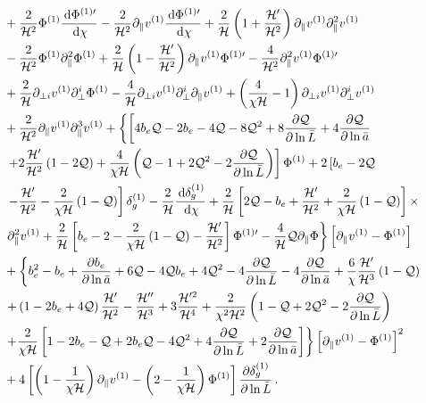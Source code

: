 \begin{align}
& + \frac{2}{\mathcal{H}^2} \Phi^{(1)} \frac{\,\mathrm{d} \Phi^{{(1)}\prime} }{\,\mathrm{d} \chi} - \frac{2}{\mathcal{H}^2} \partial_\| v^{(1)} \frac{\,\mathrm{d} \Phi^{{(1)} \prime} }{\,\mathrm{d} \chi} + \frac{2}{\mathcal{H}} \left(1 +\frac{\mathcal{H}'}{\mathcal{H}^2} \right) \partial_\| v^{(1)} \partial_\|^2 v^{(1)} \nonumber \\
& - \frac{2}{\mathcal{H}^2} \Phi^{(1)} \partial_\|^2 \Phi^{(1)} +\frac{2}{\mathcal{H}} \left(1 - \frac{\mathcal{H}'}{\mathcal{H}^2} \right) \partial_\| v^{(1)}\Phi^{(1)\prime} - \frac{4}{\mathcal{H}^2} \partial_\|^2 v^{(1)} \Phi^{(1)\prime} \nonumber \\
& + \frac{2}{\mathcal{H}} \partial_{\perp i} v^{(1)} \partial^i_\perp \Phi^{(1)} -\frac{{4}}{\mathcal{H}} \partial_{\perp i} v^{(1)} \partial_{\perp}^i \partial_\| v^{(1)} + \left(\frac{4}{ \chi \mathcal{H} } -1 \right) \partial_{\perp i} v^{(1)} \partial_{\perp}^i v^{(1)} \nonumber \\
& + \frac{2}{\mathcal{H}^2} \partial_\| v^{(1)} \partial_\|^3 v^{(1)} + \left\{ \left[ 4 b_e \mathcal{Q} - 2 b_e - 4 \mathcal{Q} - 8 \mathcal{Q}^2 + 8 \frac{\partial \mathcal{Q}}{\partial \ln \bar L} + 4 \frac{\partial \mathcal{Q}}{\partial \ln \bar a} \right. \right. \nonumber \\
&\left. \left. + 2  \frac{\mathcal{H}'}{\mathcal{H}^2} \left(1 - {2\mathcal{Q}}\right)  + \frac{4}{\chi \mathcal{H}} \left(\mathcal{Q} - 1 + 2 \mathcal{Q}^2 - 2 \frac{\partial \mathcal{Q}}{\partial \ln \bar L} \right) \right] \Phi^{(1)} + 2 \left[ b_e - 2\mathcal{Q} \right. \right. \nonumber \\
& \left. \left. -  \frac{\mathcal{H}'}{\mathcal{H}^2}  - \frac{2}{\chi \mathcal{H}} \left(1 - \mathcal{Q}\right)  \right] \delta_g^{(1)} - \frac{2}{\mathcal{H}} \frac{\,\mathrm{d} \delta_g^{(1)} }{\,\mathrm{d} \chi} + \frac{2}{\mathcal{H}} \left[ 2 \mathcal{Q} - b_e + \frac{\mathcal{H}'}{\mathcal{H}^2} + \frac{2}{\chi \mathcal{H}} \left(1 - \mathcal{Q}\right) \right]\times \right. \nonumber \\
&\left. \partial_\|^2 v^{(1)} + \frac{2}{\mathcal{H}} \left[ b_e - 2 - \frac{2}{\chi \mathcal{H}} \left(1 - \mathcal{Q} \right) - \frac{\mathcal{H}'}{\mathcal{H}^2} \right]  \Phi^{(1)\prime} - \frac{4}{\mathcal{H}} \mathcal{Q} \partial_\| \Phi \right\} \left[\partial_\| v^{(1)}- \Phi^{(1)} \right] \nonumber \\
& + \left\{ b_e^2 - b_e + \frac{\partial b_e}{\partial \ln \bar a} +6 \mathcal{Q} -4 \mathcal{Q} b_e + 4 \mathcal{Q}^2 - 4\frac{\partial \mathcal{Q}}{\partial \ln \bar L} - 4 \frac{\partial \mathcal{Q}}{\partial \ln \bar a} + \frac{6}{\chi} \frac{\mathcal{H}'}{\mathcal{H}^3} \left(1 - \mathcal{Q}\right) \right. \nonumber \\
& \left. + \left(1 - 2 b_e + 4\mathcal{Q} \right) \frac{\mathcal{H}' }{\mathcal{H}^2}  -\frac{\mathcal{H}'' }{\mathcal{H}^3} +3 \frac{\mathcal{H}^{\prime 2} }{\mathcal{H}^4} +  \frac{2}{\chi^2 \mathcal{H}^2} \left( 1 - \mathcal{Q} + 2 \mathcal{Q}^2 - 2 \frac{\partial \mathcal{Q}}{\partial \ln \bar L} \right) \right. \nonumber \\
& \left. + \frac{2}{\chi \mathcal{H}} \left[ 1 - 2 b_e - \mathcal{Q} + 2 b_e \mathcal{Q}  - 4 \mathcal{Q}^2 + 4 \frac{\partial \mathcal{Q}}{\partial \ln \bar L} + 2 \frac{\partial \mathcal{Q}}{\partial \ln \bar a} \right] \right\} \left[\partial_\| v^{(1)} - \Phi^{(1)}  \right]^2 \nonumber \\
&+ 4\left[ \left( 1 - \frac{1}{\chi \mathcal{H}} \right) \partial_\parallel v^{(1)} - \left(2 - \frac{1}{\chi \mathcal{H}} \right) \Phi^{(1)} \right] \frac{\partial \delta_g^{(1)}}{\partial \ln{\bar{L}}}\, .\label{eq:fulldeltaso}
\end{align}
